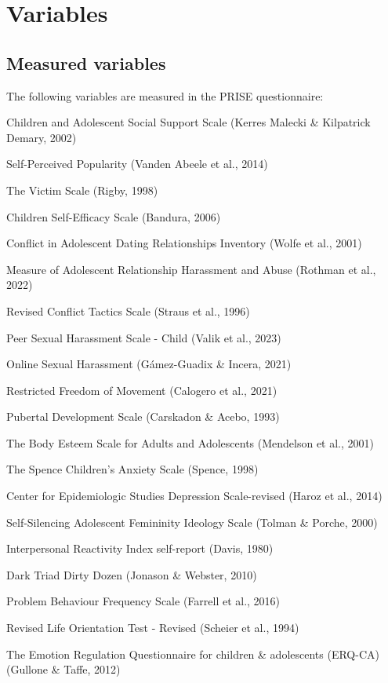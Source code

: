 \documentclass[
]{article}
\begin{document}
\section{Variables}\label{variables}

\subsection{Measured variables}\label{measured-variables}

The following variables are measured in the PRISE questionnaire:

Children and Adolescent Social Support Scale (Kerres Malecki \&
Kilpatrick Demary, 2002)

Self-Perceived Popularity (Vanden Abeele et al., 2014)

The Victim Scale (Rigby, 1998)

Children Self-Efficacy Scale (Bandura, 2006)

Conflict in Adolescent Dating Relationships Inventory (Wolfe et al.,
2001)

Measure of Adolescent Relationship Harassment and Abuse (Rothman et al.,
2022)

Revised Conflict Tactics Scale (Straus et al., 1996)

Peer Sexual Harassment Scale - Child (Valik et al., 2023)

Online Sexual Harassment (Gámez-Guadix \& Incera, 2021)

Restricted Freedom of Movement (Calogero et al., 2021)

Pubertal Development Scale (Carskadon \& Acebo, 1993)

The Body Esteem Scale for Adults and Adolescents (Mendelson et al.,
2001)

The Spence Children's Anxiety Scale (Spence, 1998)

Center for Epidemiologic Studies Depression Scale-revised (Haroz et al.,
2014)

Self-Silencing Adolescent Femininity Ideology Scale (Tolman \& Porche,
2000)

Interpersonal Reactivity Index self-report (Davis, 1980)

Dark Triad Dirty Dozen (Jonason \& Webster, 2010)

Problem Behaviour Frequency Scale (Farrell et al., 2016)

Revised Life Orientation Test - Revised (Scheier et al., 1994)

The Emotion Regulation Questionnaire for children \& adolescents
(ERQ-CA) (Gullone \& Taffe, 2012)
\end{document}
